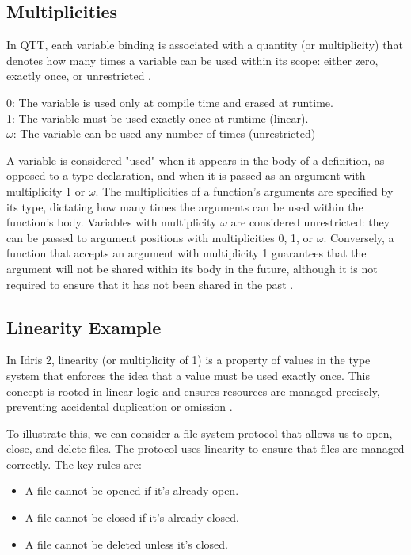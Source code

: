 \documentclass[]{rptuseminar}
\begin{document}
\subsection{Multiplicities}
\label{sec:multiplicities}
In QTT, each variable binding is associated with a quantity (or multiplicity) that denotes how many times a variable can be used within its scope: either zero, exactly once, or unrestricted \cite{atkey2018syntax}.


0: The variable is used only at compile time and erased at runtime. \\
1: The variable must be used exactly once at runtime (linear). \\
$\omega$: The variable can be used any number of times (unrestricted)

\vspace{1em}
A variable is considered "used" when it appears in the body of a definition, as opposed to a type declaration, and when it is passed as an argument with multiplicity 1 or \(\omega\). The multiplicities of a function's arguments are specified by its type, dictating how many times the arguments can be used within the function's body. Variables with multiplicity \(\omega\) are considered unrestricted: they can be passed to argument positions with multiplicities 0, 1, or \(\omega\). Conversely, a function that accepts an argument with multiplicity 1 guarantees that the argument will not be shared within its body in the future, although it is not required to ensure that it has not been shared in the past \cite{brady2021idris}.

\subsection{Linearity Example}
In Idris 2, linearity (or multiplicity of 1) is a property of values in the type system that enforces the idea that a value must be used exactly once. This concept is rooted in linear logic and ensures resources are managed precisely, preventing accidental duplication or omission \cite{brady2021idris}.

To illustrate this, we can consider a file system protocol that allows us to open, close, and delete files. The protocol uses linearity to ensure that files are managed correctly. The key rules are:
\begin{itemize}
    \item A file cannot be opened if it's already open.
    \item A file cannot be closed if it's already closed.
    \item A file cannot be deleted unless it's closed.
\end{itemize}
\end{document}
